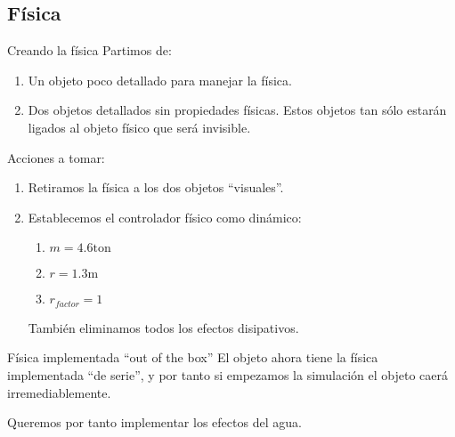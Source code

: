 \subsection{Física}

\begin{frame}{Creando la física}
Partimos de:
\begin{enumerate}
	\item Un objeto poco detallado para manejar la física.
	\item Dos objetos detallados sin propiedades físicas. Estos objetos tan sólo
	estarán ligados al objeto físico  que será invisible.
\end{enumerate}

Acciones a tomar:
\begin{enumerate}
	\item Retiramos la física a los dos objetos ``visuales''.
	\item Establecemos el controlador físico como dinámico:
	\begin{enumerate}
		\item $m = 4.6 \mathrm{ton}$
		\item $r = 1.3 \mathrm{m}$
		\item $r_{factor} = 1$
	\end{enumerate}
	También eliminamos todos los efectos disipativos.
\end{enumerate}

\end{frame}

\begin{frame}{Física implementada ``out of the box''}
El objeto ahora tiene la física implementada ``de serie'', y por tanto si
empezamos la simulación el objeto caerá irremediablemente.

Queremos por tanto implementar los efectos del agua.
\end{frame}
